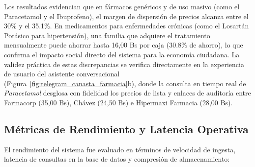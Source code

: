 \begin{interpretacionbox}
Los resultados evidencian que en fármacos genéricos y de uso masivo (como el Paracetamol y el Ibuprofeno), el margen de dispersión de precios alcanza entre el 30\% y el 35.1\%. En medicamentos para enfermedades crónicas (como el Losartán Potásico para hipertensión), una familia que adquiere el tratamiento mensualmente puede ahorrar hasta 16,00 Bs por caja (30.8\% de ahorro), lo que confirma el impacto social directo del sistema para la economía ciudadana. La validez práctica de estas discrepancias se verifica directamente en la experiencia de usuario del asistente conversacional (Figura~\ref{fig:telegram_canasta_farmacia}b), donde la consulta en tiempo real de \textit{Paracetamol} desglosa con fidelidad los precios de lista y enlaces de auditoría entre Farmacorp (35,00 Bs), Chávez (24,50 Bs) e Hipermaxi Farmacia (28,00 Bs).
\end{interpretacionbox}

\subsection{Métricas de Rendimiento y Latencia Operativa}
El rendimiento del sistema fue evaluado en términos de velocidad de ingesta, latencia de consultas en la base de datos y compresión de almacenamiento:

